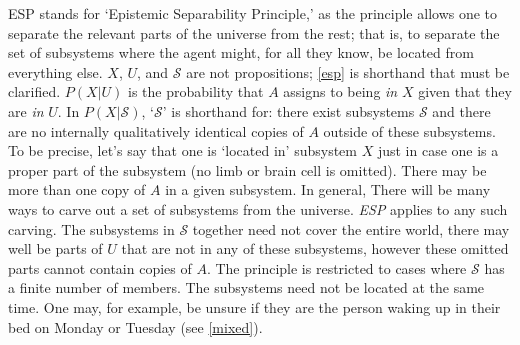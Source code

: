 \documentclass[12pt,onecolumn,secnumarabic,amsmath,amssymb,balancelastpage,nofootinbib]{article}
\begin{document}
ESP stands for `Epistemic Separability Principle,' as the principle allows one to separate the relevant parts of the universe from the rest; that is, to separate the set of subsystems where the agent might, for all they know, be located from everything else. $X$, $U$, and $\mathcal{S}$ are not propositions; \eqref{esp} is shorthand that must be clarified.  $P(X|U)$ is the probability that $A$ assigns to being \emph{in} $X$ given that they are \emph{in} $U$.  In $P(X|\mathcal{S})$, `$\mathcal{S}$' is shorthand for: there exist subsystems $\mathcal{S}$ and there are no internally qualitatively identical copies of $A$ outside of these subsystems.  To be precise, let's say that one is `located in' subsystem $X$ just in case one is a proper part of the subsystem (no limb or brain cell is omitted).  There may be more than one copy of $A$ in a given subsystem.  In general, There will be many ways to carve out a set of subsystems from the universe.  \emph{ESP} applies to any such carving.  The subsystems in $\mathcal{S}$ together need not cover the entire world, there may well be parts of $U$ that are not in any of these subsystems, however these omitted parts cannot contain copies of $A$.  The principle is restricted to cases where $\mathcal{S}$ has a finite number of members.  The subsystems need not be located at the same time.  One may, for example, be unsure if they are the person waking up in their bed on Monday or Tuesday (see \textsection \ref{mixed}).  
\end{document}
